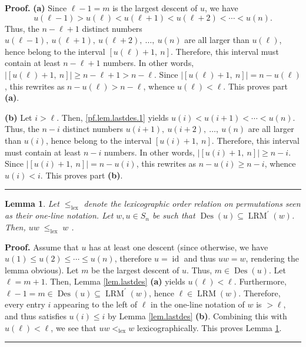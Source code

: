 \documentclass[submission]{FPSAC2026}
\newtheorem{lem}{Lemma}
\newcommand{\id}{\operatorname{id}} %
\newcommand{\Des}{\operatorname{Des}}
\newcommand{\LRM}{\operatorname{LRM}}
\newcommand{\lex}{\operatorname{lex}}
\newenvironment{proof}[1][Proof]{\noindent\textbf{#1.} }{\ \rule{0.5em}{0.5em}}
\begin{document}
\begin{proof}
\textbf{(a)} Since $\ell -1=m$ is the largest descent of $u$, we have%
\begin{equation}
u\left( \ell -1\right) >u\left( \ell \right) <u\left( \ell +1\right)
<u\left( \ell +2\right) <\cdots <u\left( n\right) .  \label{pf.lem.lastdes.1}
\end{equation}%
Thus, the $n-\ell +1$ distinct numbers $u\left( \ell -1\right) ,\ u\left(
\ell +1\right) ,\ u\left( \ell +2\right) ,\ \ldots ,\ u\left( n\right) $ are
all larger than $u\left( \ell \right) $, hence belong to the interval $\left[
u\left( \ell \right) +1,\ n\right] $. Therefore, this interval must contain
at least $n-\ell +1$ numbers. In other words, $\left\vert \left[ u\left(
\ell \right) +1,\ n\right] \right\vert \geq n-\ell +1>n-\ell $. Since $%
\left\vert \left[ u\left( \ell \right) +1,\ n\right] \right\vert =n-u\left(
\ell \right) $, this rewrites as $n-u\left( \ell \right) >n-\ell $, whence $%
u(\ell )<\ell $. This proves part \textbf{(a)}. 
\medskip

\textbf{(b)} Let $i>\ell $. Then, 
\eqref{pf.lem.lastdes.1} yields $u(i)<u(i+1)<\cdots <u(n)$. Thus, the $n-i$
distinct numbers $u\left( i+1\right) ,\ u\left( i+2\right) ,\ \ldots ,\
u\left( n\right) $ are all larger than $u\left( i\right) $, hence belong to
the interval $\left[ u\left( i\right) +1,\ n\right] $. Therefore, this
interval must contain at least $n-i$ numbers. In other words, $\left\vert %
\left[ u\left( i\right) +1,\ n\right] \right\vert \geq n-i$. Since $%
\left\vert \left[ u\left( i\right) +1,\ n\right] \right\vert =n-u\left(
i\right) $, this rewrites as $n-u\left( i\right) \geq n-i$, whence $u(i)<i$.
This proves part \textbf{(b)}.
\end{proof}

\begin{lem}
\label{lem.LRM.1} Let $\leq_{\lex}$ denote the lexicographic order
relation on permutations seen as their one-line notation. Let $w,u\in S_{n}$
be such that $\Des (u)\subseteq \LRM^{\prime }(w)$. Then, $%
uw\;\leq_{\lex}\;w$ .
\end{lem}

\begin{proof}
Assume that $u$ has at least one descent (since otherwise, we have $u\left(
1\right) \leq u\left( 2\right) \leq \cdots \leq u\left( n\right) $,
therefore $u=\id$ and thus $uw=w$, rendering the lemma obvious).
Let $m$ be the largest descent of $u$. Thus, $m\in \Des (u)$. Let $\ell
=m+1$. Then, Lemma \ref{lem.lastdes} \textbf{(a)} yields $u(\ell )<\ell $.
Furthermore, $\ell -1=m\in \Des (u)\subseteq \LRM^{\prime }(w)$,
hence $\ell \in \LRM(w)$. Therefore, every entry $i$ appearing to the
left of $\ell $ in the one-line notation of $w$ is $>\ell $, and thus
satisfies $u(i)\leq i$ by Lemma \ref{lem.lastdes} \textbf{(b)}. Combining
this with $u(\ell )<\ell $, we see that $uw<_{\lex}w$
lexicographically. This proves Lemma \ref{lem.LRM.1}.
\end{proof}
\end{document}
